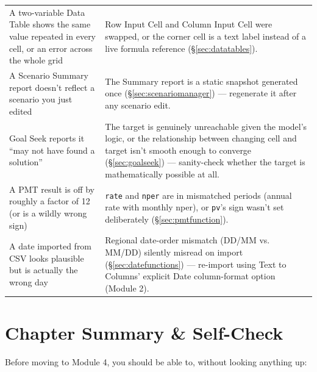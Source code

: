 \documentclass[11pt,a4paper]{article}
\begin{document}
\begin{center}
\begin{tabular}{@{}L{3.8cm}L{8.2cm}@{}}
A two-variable Data Table shows the same value repeated in every cell, or an error across the whole grid & Row Input Cell and Column Input Cell were swapped, or the corner cell is a text label instead of a live formula reference (\S\ref{sec:datatables}). \\
A Scenario Summary report doesn't reflect a scenario you just edited & The Summary report is a static snapshot generated once (\S\ref{sec:scenariomanager}) --- regenerate it after any scenario edit. \\
Goal Seek reports it ``may not have found a solution'' & The target is genuinely unreachable given the model's logic, or the relationship between changing cell and target isn't smooth enough to converge (\S\ref{sec:goalseek}) --- sanity-check whether the target is mathematically possible at all. \\
A PMT result is off by roughly a factor of 12 (or is a wildly wrong sign) & \texttt{rate} and \texttt{nper} are in mismatched periods (annual rate with monthly nper), or \texttt{pv}'s sign wasn't set deliberately (\S\ref{sec:pmtfunction}). \\
A date imported from CSV looks plausible but is actually the wrong day & Regional date-order mismatch (DD/MM vs. MM/DD) silently misread on import (\S\ref{sec:datefunctions}) --- re-import using Text to Columns' explicit Date column-format option (Module 2). \\
\bottomrule
\end{tabular}
\end{center}

\section{Chapter Summary \& Self-Check}

Before moving to Module 4, you should be able to, without looking anything up:
\end{document}
